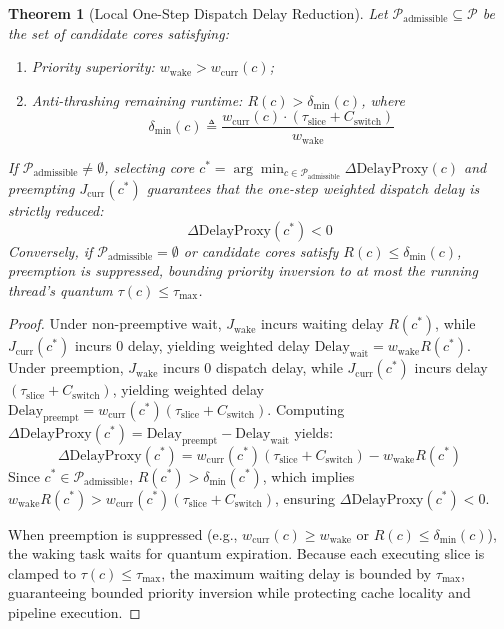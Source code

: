 \documentclass[letterpaper,twocolumn,10pt]{article}
\newtheorem{theorem}{Theorem}
\begin{document}
\begin{theorem}[Local One-Step Dispatch Delay Reduction]
\label{thm:oapf}
Let $\mathcal{P}_{\mathrm{admissible}} \subseteq \mathcal{P}$ be the set of candidate cores satisfying:
\begin{enumerate}
    \item Priority superiority: $w_{\mathrm{wake}} > w_{\mathrm{curr}}(c)$;
    \item Anti-thrashing remaining runtime: $R(c) > \delta_{\min}(c)$, where
    \begin{equation}
    \delta_{\min}(c) \triangleq \frac{w_{\mathrm{curr}}(c) \cdot (\tau_{\mathrm{slice}} + C_{\mathrm{switch}})}{w_{\mathrm{wake}}}
    \end{equation}
\end{enumerate}
If $\mathcal{P}_{\mathrm{admissible}} \ne \emptyset$, selecting core $c^* = \arg\min_{c \in \mathcal{P}_{\mathrm{admissible}}} \Delta\mathrm{DelayProxy}(c)$ and preempting $J_{\mathrm{curr}}(c^*)$ guarantees that the one-step weighted dispatch delay is strictly reduced:
\begin{equation}
\Delta\mathrm{DelayProxy}(c^*) < 0
\end{equation}
Conversely, if $\mathcal{P}_{\mathrm{admissible}} = \emptyset$ or candidate cores satisfy $R(c) \le \delta_{\min}(c)$, preemption is suppressed, bounding priority inversion to at most the running thread's quantum $\tau(c) \le \tau_{\max}$.
\end{theorem}

\begin{proof}
Under non-preemptive wait, $J_{\mathrm{wake}}$ incurs waiting delay $R(c^*)$, while $J_{\mathrm{curr}}(c^*)$ incurs 0 delay, yielding weighted delay $\mathrm{Delay}_{\mathrm{wait}} = w_{\mathrm{wake}} R(c^*)$. Under preemption, $J_{\mathrm{wake}}$ incurs 0 dispatch delay, while $J_{\mathrm{curr}}(c^*)$ incurs delay $(\tau_{\mathrm{slice}} + C_{\mathrm{switch}})$, yielding weighted delay $\mathrm{Delay}_{\mathrm{preempt}} = w_{\mathrm{curr}}(c^*) (\tau_{\mathrm{slice}} + C_{\mathrm{switch}})$. Computing $\Delta\mathrm{DelayProxy}(c^*) = \mathrm{Delay}_{\mathrm{preempt}} - \mathrm{Delay}_{\mathrm{wait}}$ yields:
\begin{equation}
\Delta\mathrm{DelayProxy}(c^*) = w_{\mathrm{curr}}(c^*)(\tau_{\mathrm{slice}} + C_{\mathrm{switch}}) - w_{\mathrm{wake}} R(c^*)
\end{equation}
Since $c^* \in \mathcal{P}_{\mathrm{admissible}}$, $R(c^*) > \delta_{\min}(c^*)$, which implies $w_{\mathrm{wake}} R(c^*) > w_{\mathrm{curr}}(c^*) (\tau_{\mathrm{slice}} + C_{\mathrm{switch}})$, ensuring $\Delta\mathrm{DelayProxy}(c^*) < 0$. 

When preemption is suppressed (e.g., $w_{\mathrm{curr}}(c) \ge w_{\mathrm{wake}}$ or $R(c) \le \delta_{\min}(c)$), the waking task waits for quantum expiration. Because each executing slice is clamped to $\tau(c) \le \tau_{\max}$, the maximum waiting delay is bounded by $\tau_{\max}$, guaranteeing bounded priority inversion while protecting cache locality and pipeline execution.
\end{proof}
\end{document}
